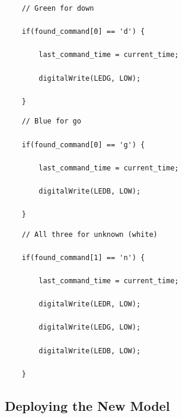 \begin{enumerate}
  \begin{lstlisting}
    // Green for down
    
    if(found_command[0] == 'd') {
        
        last_command_time = current_time;
        
        digitalWrite(LEDG, LOW);
        
    }
  \end{lstlisting}  
    
  \begin{lstlisting}
    // Blue for go
    
    if(found_command[0] == 'g') {
        
        last_command_time = current_time;
        
        digitalWrite(LEDB, LOW);
        
    }
  \end{lstlisting}  
    
  \begin{lstlisting}
    // All three for unknown (white)
    
    if(found_command[1] == 'n') {
        
        last_command_time = current_time;
        
        digitalWrite(LEDR, LOW);
        
        digitalWrite(LEDG, LOW);
        
        digitalWrite(LEDB, LOW);
        
    }
  \end{lstlisting}  
  
\end{enumerate}

    
\subsection{Deploying the New Model}

